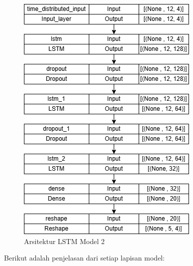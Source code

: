 \begin{figure} [H] \centering
    \includegraphics[scale=0.8]{gambar/lstmmodel2.png} 
    \caption{Arsitektur LSTM Model 2}
    \label{fig:lstm2}
\end{figure}

Berikut adalah penjelasan dari setiap lapisan model:

